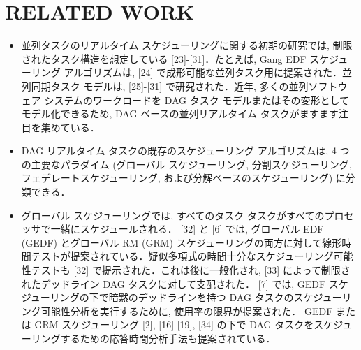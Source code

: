 
\section{RELATED WORK}
\label{sec: related work}

\begin{frame}{}
    \begin{itemize}
        \item 並列タスクのリアルタイム スケジューリングに関する初期の研究では, 制限されたタスク構造を想定している [23]-[31]．たとえば, Gang EDF スケジューリング アルゴリズムは, [24] で成形可能な並列タスク用に提案された．並列同期タスク モデルは, [25]-[31] で研究された．近年, 多くの並列ソフトウェア システムのワークロードを DAG タスク モデルまたはその変形としてモデル化できるため, DAG ベースの並列リアルタイム タスクがますます注目を集めている．
    \end{itemize}
\end{frame}

\begin{frame}{}
    \begin{itemize}
        \item DAG リアルタイム タスクの既存のスケジューリング アルゴリズムは, 4 つの主要なパラダイム (グローバル スケジューリング, 分割スケジューリング, フェデレートスケジューリング, および分解ベースのスケジューリング) に分類できる．
    \end{itemize}
\end{frame}

\begin{frame}{}
    \begin{itemize}
        \item グローバル スケジューリングでは, すべてのタスク タスクがすべてのプロセッサで一緒にスケジュールされる． [32] と [6] では, グローバル EDF (GEDF) とグローバル RM (GRM) スケジューリングの両方に対して線形時間テストが提案されている．疑似多項式の時間十分なスケジューリング可能性テストも [32] で提示された．これは後に一般化され, [33] によって制限されたデッドライン DAG タスクに対して支配された． [7] では, GEDF スケジューリングの下で暗黙のデッドラインを持つ DAG タスクのスケジューリング可能性分析を実行するために, 使用率の限界が提案された． GEDF または GRM スケジューリング [2], [16]-[19], [34] の下で DAG タスクをスケジューリングするための応答時間分析手法も提案されている．
    \end{itemize}
\end{frame}


